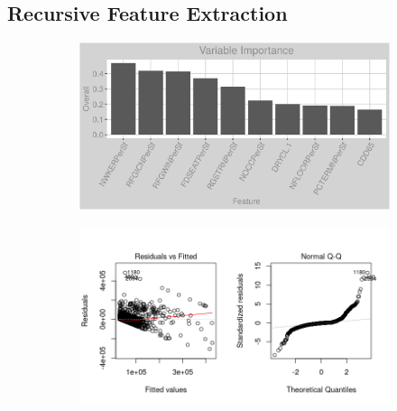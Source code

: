 \subsection{Recursive Feature Extraction}
\label{appendix:natural_gas:rfe}
\begin{figure}[h]
\centering
\begin{subfigure}{1\textwidth}
\centering
\includegraphics[width=.99\textwidth, height=0.35\textheight]{Images/natural_gas_psf_rfe_vars.png}
\end{subfigure}
\begin{subfigure}{1\textwidth}
\centering
\includegraphics[width=.99\textwidth, height=0.4\textheight]{Images/natural_gas_psf_rfe_res_1.png}
\end{subfigure}
\end{figure}
\FloatBarrier
\newpage
